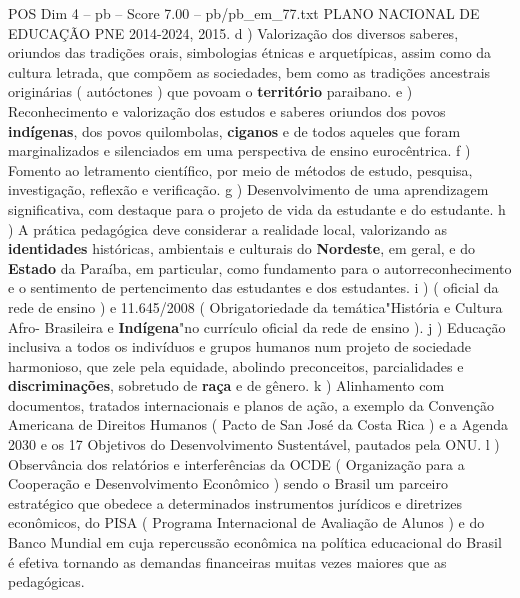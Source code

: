\begin{textsample}{POS Dim 4 – pb – Score 7.00 – pb/pb\_em\_77.txt}
PLANO NACIONAL DE EDUCAÇÃO PNE 2014-2024, 2015. d ) Valorização dos diversos saberes, oriundos das tradições orais, simbologias étnicas e arquetípicas, assim como da cultura letrada, que compõem as sociedades, bem como as tradições ancestrais originárias ( autóctones ) que povoam o \textbf{território} paraibano. e ) Reconhecimento e valorização dos estudos e saberes oriundos dos povos \textbf{indígenas}, dos povos quilombolas, \textbf{ciganos} e de todos aqueles que foram marginalizados e silenciados em uma perspectiva de ensino eurocêntrica. f ) Fomento ao letramento científico, por meio de métodos de estudo, pesquisa, investigação, reflexão e verificação. g ) Desenvolvimento de uma aprendizagem significativa, com destaque para o projeto de vida da estudante e do estudante. h ) A prática pedagógica deve considerar a realidade local, valorizando as \textbf{identidades} históricas, ambientais e culturais do \textbf{Nordeste}, em geral, e do \textbf{Estado} da Paraíba, em particular, como fundamento para o autorreconhecimento e o sentimento de pertencimento das estudantes e dos estudantes. i ) ( oficial da rede de ensino ) e 11.645/2008 ( Obrigatoriedade da temática"História e Cultura Afro- Brasileira e \textbf{Indígena}"no currículo oficial da rede de ensino ). j ) Educação inclusiva a todos os indivíduos e grupos humanos num projeto de sociedade harmonioso, que zele pela equidade, abolindo preconceitos, parcialidades e \textbf{discriminações}, sobretudo de \textbf{raça} e de gênero. k ) Alinhamento com documentos, tratados internacionais e planos de ação, a exemplo da Convenção Americana de Direitos Humanos ( Pacto de San José da Costa Rica ) e a Agenda 2030 e os 17 Objetivos do Desenvolvimento Sustentável, pautados pela ONU. l ) Observância dos relatórios e interferências da OCDE ( Organização para a Cooperação e Desenvolvimento Econômico ) sendo o Brasil um parceiro estratégico que obedece a determinados instrumentos jurídicos e diretrizes econômicos, do PISA ( Programa Internacional de Avaliação de Alunos ) e do Banco Mundial em cuja repercussão econômica na política educacional do Brasil é efetiva tornando as demandas financeiras muitas vezes maiores que as pedagógicas.

\end{textsample}
